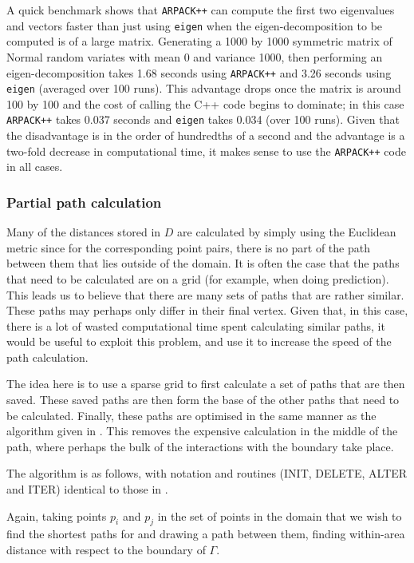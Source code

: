 {A quick benchmark shows that \texttt{ARPACK++} can compute the first two eigenvalues and vectors faster than just using \texttt{eigen} when the eigen-decomposition to be computed is of a large matrix. Generating a 1000 by 1000 symmetric matrix of Normal random variates with mean 0 and variance 1000, then performing an eigen-decomposition takes 1.68 seconds using \texttt{ARPACK++} and 3.26 seconds using \texttt{eigen} (averaged over 100 runs). This advantage drops once the matrix is around 100 by 100 and the cost of calling the C++ code begins to dominate; in this case \texttt{ARPACK++} takes 0.037 seconds and \texttt{eigen} takes 0.034 (over 100 runs). Given that the disadvantage is in the order of hundredths of a second and the advantage is a two-fold decrease in computational time, it makes sense to use the \texttt{ARPACK++} code in all cases.


\subsubsection{Partial path calculation}

Many of the distances stored in $D$ are calculated by simply using the Euclidean metric since for the corresponding point pairs, there is no part of the path between them that lies outside of the domain. It is often the case that the paths that need to be calculated are on a grid (for example, when doing prediction). This leads us to believe that there are many sets of paths that are rather similar. These paths may perhaps only differ in their final vertex. Given that, in this case, there is a lot of wasted computational time spent calculating similar paths, it would be useful to exploit this problem, and use it to increase the speed of the path calculation.

The idea here is to use a sparse grid to first calculate a set of paths that are then saved. These saved paths are then form the base of the other paths that need to be calculated. Finally, these paths are optimised in the same manner as the algorithm given in . This removes the expensive calculation in the middle of the path, where perhaps the bulk of the interactions with the boundary take place.

The algorithm is as follows, with notation and routines (INIT, DELETE, ALTER and ITER) identical to those in . 

Again, taking points $p_i$ and $p_j$ in the set of points in the domain that we wish to find the shortest paths for and drawing a path between them, finding within-area distance with respect to the boundary of $\Gamma$.

}
